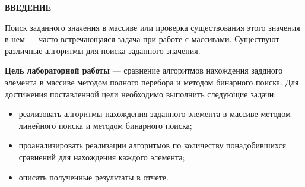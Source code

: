 \begin{center}
    \textbf{ВВЕДЕНИЕ}
\end{center}

Поиск заданного значения в массиве или проверка существования этого значения в нем --- часто встречающаяся задача при работе с массивами. Существуют различные алгоритмы для поиска заданного значения.

\textbf{Цель лабораторной работы} --- сравнение алгоритмов нахождения заддного элемента в массиве методом полного перебора и методом бинарного поиска. Для достижения поставленной цели необходимо выполнить следующие задачи:
\begin{itemize}
    \item реализовать алгоритмы нахождения заданного элемента в массиве методом линейного поиска и методом бинарного поиска;
    \item проанализировать реализации алгоритмов по количеству понадобившихся сравнений для нахождения каждого элемента;
    \item описать полученные результаты в отчете.
\end{itemize}